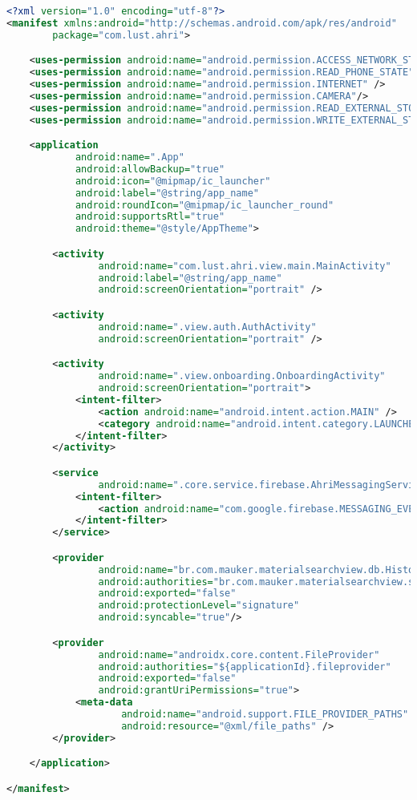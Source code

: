 \begin{lstlisting}[language=Xml,label={lst:manifest},caption={AndroidManifest.xml}]
<?xml version="1.0" encoding="utf-8"?>
<manifest xmlns:android="http://schemas.android.com/apk/res/android"
        package="com.lust.ahri">

    <uses-permission android:name="android.permission.ACCESS_NETWORK_STATE" />
    <uses-permission android:name="android.permission.READ_PHONE_STATE" />
    <uses-permission android:name="android.permission.INTERNET" />
    <uses-permission android:name="android.permission.CAMERA"/>
    <uses-permission android:name="android.permission.READ_EXTERNAL_STORAGE" />
    <uses-permission android:name="android.permission.WRITE_EXTERNAL_STORAGE" />

    <application
            android:name=".App"
            android:allowBackup="true"
            android:icon="@mipmap/ic_launcher"
            android:label="@string/app_name"
            android:roundIcon="@mipmap/ic_launcher_round"
            android:supportsRtl="true"
            android:theme="@style/AppTheme">

        <activity
                android:name="com.lust.ahri.view.main.MainActivity"
                android:label="@string/app_name"
                android:screenOrientation="portrait" />

        <activity
                android:name=".view.auth.AuthActivity"
                android:screenOrientation="portrait" />

        <activity
                android:name=".view.onboarding.OnboardingActivity"
                android:screenOrientation="portrait">
            <intent-filter>
                <action android:name="android.intent.action.MAIN" />
                <category android:name="android.intent.category.LAUNCHER" />
            </intent-filter>
        </activity>

        <service
                android:name=".core.service.firebase.AhriMessagingService">
            <intent-filter>
                <action android:name="com.google.firebase.MESSAGING_EVENT"/>
            </intent-filter>
        </service>

        <provider
                android:name="br.com.mauker.materialsearchview.db.HistoryProvider"
                android:authorities="br.com.mauker.materialsearchview.searchhistorydatabase"
                android:exported="false"
                android:protectionLevel="signature"
                android:syncable="true"/>

        <provider
                android:name="androidx.core.content.FileProvider"
                android:authorities="${applicationId}.fileprovider"
                android:exported="false"
                android:grantUriPermissions="true">
            <meta-data
                    android:name="android.support.FILE_PROVIDER_PATHS"
                    android:resource="@xml/file_paths" />
        </provider>

    </application>

</manifest>
\end{lstlisting}

